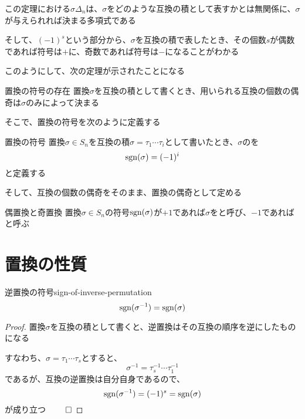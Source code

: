 \documentclass[../../../topic_linear-algebra]{subfiles}
\begin{document}
この定理における$\sigma\Delta_n$は、$\sigma$をどのような互換の積として表すかとは無関係に、$\sigma$が与えられれば決まる多項式である

\br

そして、$(-1)^s$という部分から、$\sigma$を互換の積で表したとき、その個数$s$が偶数であれば符号は$+$に、奇数であれば符号は$-$になることがわかる

\br

このようにして、次の定理が示されたことになる

\begin{theorem*}{置換の符号の存在}
  置換$\sigma$を互換の積として書くとき、用いられる互換の個数の偶奇は$\sigma$のみによって決まる
\end{theorem*}

そこで、置換の符号を次のように定義する

\begin{definition}{置換の符号}
  置換$\sigma \in S_n$を互換の積$\sigma = \tau_1 \cdots \tau_i$として書いたとき、$\sigma$のを
  \begin{equation*}
    \operatorname{sgn}(\sigma) = (-1)^i
  \end{equation*}
  と定義する
\end{definition}

そして、互換の個数の偶奇をそのまま、置換の偶奇として定める

\begin{definition}{偶置換と奇置換}
  置換$\sigma \in S_n$の符号$\operatorname{sgn}(\sigma)$が$+1$であれば$\sigma$をと呼び、$-1$であればと呼ぶ
\end{definition}

\sectionline
\section{置換の性質}

\begin{theorem}{逆置換の符号}{sign-of-inverse-permutation}
  \begin{equation*}
    \operatorname{sgn}(\sigma^{-1}) = \operatorname{sgn}(\sigma)
  \end{equation*}
\end{theorem}

\begin{proof}
  置換$\sigma$を互換の積として書くと、逆置換はその互換の順序を逆にしたものになる

  すなわち、$\sigma = \tau_1 \cdots \tau_s$とすると、
  \begin{equation*}
    \sigma^{-1} = \tau_s^{-1} \cdots \tau_1^{-1}
  \end{equation*}
  であるが、互換の逆置換は自分自身であるので、
  \begin{equation*}
    \operatorname{sgn}(\sigma^{-1}) = (-1)^s = \operatorname{sgn}(\sigma)
  \end{equation*}
  が成り立つ $\qed$
\end{proof}
\end{document}
